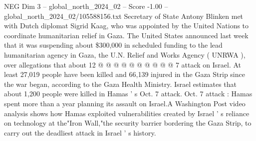 \begin{textsample}{NEG Dim 3 – global\_north\_2024\_02 – Score -1.00 – global\_north\_2024\_02/105588156.txt}
Secretary of State Antony Blinken met with Dutch diplomat Sigrid Kaag, who was appointed by the United Nations to coordinate humanitarian relief in Gaza.
The United States announced last week that it was suspending about \$300,000 in scheduled funding to the lead humanitarian agency in Gaza, the U.N.
Relief and Works Agency ( UNRWA ), over allegations that about 12 @ @ @ @ @ @ @ @ @ @ 7 attack on Israel.
At least 27,019 people have been killed and 66,139 injured in the Gaza Strip since the war began, according to the Gaza Health Ministry.
Israel estimates that about 1,200 people were killed in Hamas ' s Oct. 7 attack.
Oct. 7 attack : Hamas spent more than a year planning its assault on Israel.A Washington Post video analysis shows how Hamas exploited vulnerabilities created by Israel ' s reliance on technology at the"Iron Wall,"the security barrier bordering the Gaza Strip, to carry out the deadliest attack in Israel ' s history.

\end{textsample}
